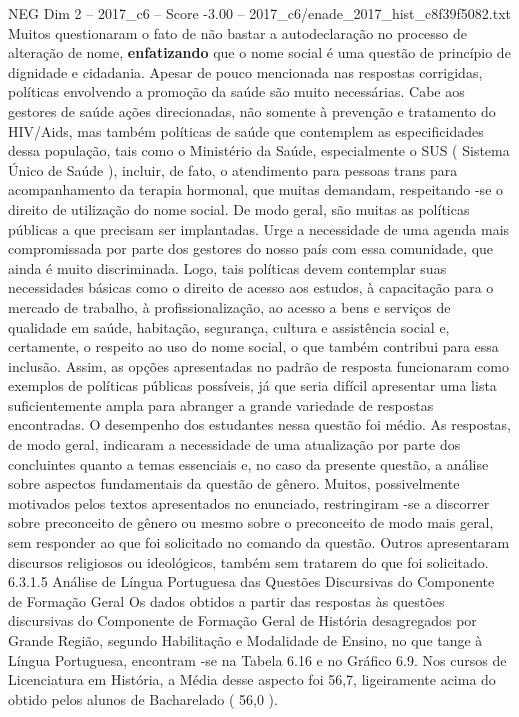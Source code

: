 \begin{textsample}{NEG Dim 2 – 2017\_c6 – Score -3.00 – 2017\_c6/enade\_2017\_hist\_c8f39f5082.txt}
Muitos questionaram o fato de não bastar a autodeclaração no processo de alteração de nome, \textbf{enfatizando} que o nome social é uma questão de princípio de dignidade e cidadania.
Apesar de pouco mencionada nas respostas corrigidas, políticas envolvendo a promoção da saúde são muito necessárias.
Cabe aos gestores de saúde ações direcionadas, não somente à prevenção e tratamento do HIV/Aids, mas também políticas de saúde que contemplem as especificidades dessa população, tais como o Ministério da Saúde, especialmente o SUS ( Sistema Único de Saúde ), incluir, de fato, o atendimento para pessoas trans para acompanhamento da terapia hormonal, que muitas demandam, respeitando -se o direito de utilização do nome social.
De modo geral, são muitas as políticas públicas a que precisam ser implantadas.
Urge a necessidade de uma agenda mais compromissada por parte dos gestores do nosso país com essa comunidade, que ainda é muito discriminada.
Logo, tais políticas devem contemplar suas necessidades básicas como o direito de acesso aos estudos, à capacitação para o mercado de trabalho, à profissionalização, ao acesso a bens e serviços de qualidade em saúde, habitação, segurança, cultura e assistência social e, certamente, o respeito ao uso do nome social, o que também contribui para essa inclusão.
Assim, as opções apresentadas no padrão de resposta funcionaram como exemplos de políticas públicas possíveis, já que seria difícil apresentar uma lista suficientemente ampla para abranger a grande variedade de respostas encontradas.
O desempenho dos estudantes nessa questão foi médio.
As respostas, de modo geral, indicaram a necessidade de uma atualização por parte dos concluintes quanto a temas essenciais e, no caso da presente questão, a análise sobre aspectos fundamentais da questão de gênero.
Muitos, possivelmente motivados pelos textos apresentados no enunciado, restringiram -se a discorrer sobre preconceito de gênero ou mesmo sobre o preconceito de modo mais geral, sem responder ao que foi solicitado no comando da questão.
Outros apresentaram discursos religiosos ou ideológicos, também sem tratarem do que foi solicitado. 6.3.1.5 Análise de Língua Portuguesa das Questões Discursivas do Componente de Formação Geral Os dados obtidos a partir das respostas às questões discursivas do Componente de Formação Geral de História desagregados por Grande Região, segundo Habilitação e Modalidade de Ensino, no que tange à Língua Portuguesa, encontram -se na Tabela 6.16 e no Gráfico 6.9.
Nos cursos de Licenciatura em História, a Média desse aspecto foi 56,7, ligeiramente acima do obtido pelos alunos de Bacharelado ( 56,0 ).

\end{textsample}
